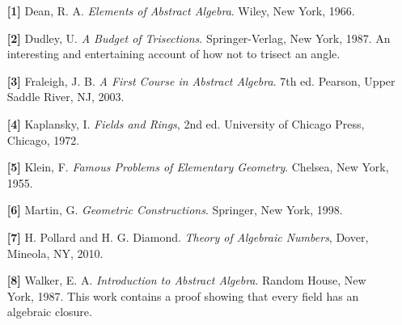 {\small
\begin{itemize}



 
\item[\textbf{[1]}] %
Dean, R. A. \textit{Elements of Abstract Algebra}. Wiley, New
York, 1966.

\item[\textbf{[2]}] %
Dudley, U. \textit{A Budget of Trisections}. Springer-Verlag, New
York, 1987. An interesting and entertaining account of how not to 
trisect an angle.

\item[\textbf{[3]}] %
Fraleigh, J. B. 
\textit{A First Course in Abstract Algebra}. 7th ed.
Pearson, Upper Saddle River, NJ, 2003. 
 
\item[\textbf{[4]}] %
Kaplansky, I. \textit{Fields and Rings}, 2nd ed. University of Chicago
Press, Chicago, 1972. 
 
\item[\textbf{[5]}] %
Klein, F. \textit{Famous Problems of Elementary Geometry}.
Chelsea, New York, 1955.

\item[\textbf{[6]}] %
Martin, G.
\textit{Geometric Constructions}.
Springer, New York, 1998.

\item[\textbf{[7]}] %
H. Pollard and H. G. Diamond. \textit{Theory of Algebraic Numbers},
Dover, Mineola, NY, 2010.

\item[\textbf{[8]}] %
Walker, E. A. \textit{Introduction to Abstract Algebra}. Random House, 
New York, 1987. This work contains a proof showing that every 
field has an algebraic closure.
 
\end{itemize}
}

